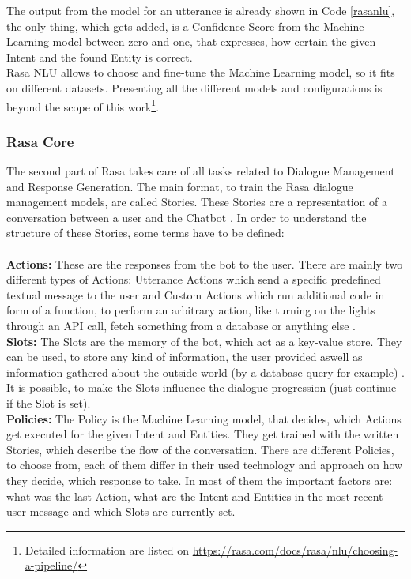 \documentclass[10pt,final,journal,a4paper,oneside,twocolumn]{IEEEtran}
\begin{document}
The output from the model for an utterance is already shown in Code \ref{rasanlu}, the only thing, which gets added, is a Confidence-Score from the Machine Learning model between zero and one, that expresses, how certain the given Intent and the found Entity is correct.\\
Rasa NLU allows to choose and fine-tune the Machine Learning model, so it fits on different datasets. Presenting all the different models and configurations is beyond the scope of this work\footnote{Detailed information are listed on \href{https://rasa.com/docs/rasa/nlu/choosing-a-pipeline/}{https://rasa.com/docs/rasa/nlu/choosing-a-pipeline/}}.
\\
\subsubsection{Rasa Core}
The second part of Rasa takes care of all tasks related to Dialogue Management and Response Generation. The main format, to train the Rasa dialogue management models, are called Stories. These Stories are a representation of a conversation between a user and the Chatbot \cite{b22}. In order to understand the structure of these Stories, some terms have to be defined:\\
\\
\textbf{Actions:} These are the responses from the bot to the user. There are mainly two different types of Actions: Utterance Actions which send a specific predefined textual message to the user and Custom Actions which run additional code in form of a function, to perform an arbitrary action, like turning on the lights through an API call, fetch something from a database or anything else \cite{b22}.\\
\textbf{Slots:} The Slots are the memory of the bot, which act as a key-value store. They can be used, to store any kind of information, the user provided aswell as information gathered about the outside world (by a database query for example) \cite{b22}. It is possible, to make the Slots influence the dialogue progression (just continue if the Slot is set). \\
\textbf{Policies:} The Policy is the Machine Learning model, that decides, which Actions get executed for the given Intent and Entities. They get trained with the written Stories, which describe the flow of the conversation. There are different Policies, to choose from, each of them differ in their used technology and approach on how they decide, which response to take. In most of them the important factors are: what was the last Action, what are the Intent and Entities in the most recent user message and which Slots are currently set. \cite{b23}\\
\end{document}
